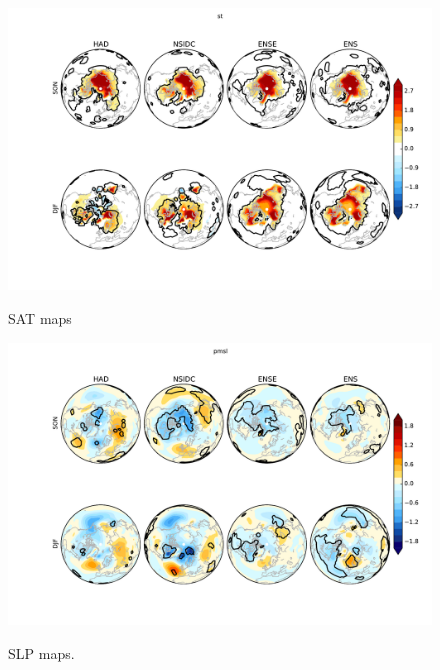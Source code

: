 \documentclass[twocol]{ametsoc}
\begin{document}
\begin{figure}[t]
  \noindent\includegraphics[width=35pc,angle=0]{stdiffsigcont_enssubplot_forpap3_seas_nh2.pdf}\\ %
  \caption{SAT maps
}\label{fig:fig3}
\end{figure}

\begin{figure}[t]
  \noindent\includegraphics[width=35pc,angle=0]{pmsldiffsigcont_enssubplot_forpap3_seas_nh2.pdf} \\ %
  \caption{SLP maps.
}\label{fig:fig3b}
\end{figure}
\end{document}
